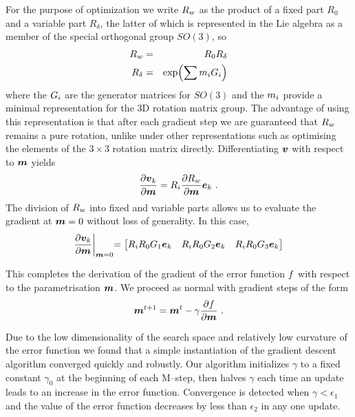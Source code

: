For the purpose of optimization we write $\SceneR$ as the product of a
fixed part $R_0$ and a variable part $R_{\delta}$, the latter of which
is represented in the Lie algebra as a member of the special
orthogonal group $SO(3)$, so
\begin{eqnarray}
  \SceneR &=& R_0 R_{\delta} \\
  R_{\delta} &=& \exp\Bigl(\sum \LieM_i \Gen_i\Bigr)
\end{eqnarray}
where the $\Gen_i$ are the generator matrices for $SO(3)$ and the
$\LieM_i$ provide a minimal representation for the 3D rotation matrix
group. The advantage of using this representation is that after each
gradient step we are guaranteed that $\SceneR$ remains a pure
rotation, unlike under other representations such as optimising the
elements of the $3 \times 3$ rotation matrix directly. Differentiating
$\vpt$ with respect to $\LieMs$ yields
\begin{equation}
  \Deriv{\vpt_k}{\LieMs} = \CamR_i \Deriv{\SceneR}{\LieMs} \ebasis_k ~.
\end{equation}
The division of $\SceneR$ into fixed and variable parts allows us to
evaluate the gradient at $\LieMs=0$ without loss of generality. In
this case,
\begin{equation}
  \Deriv{\vpt_k}{\LieMs} \EvalAt{\LieMs=0} =
  \begin{bmatrix}
    \CamR_i R_0 \Gen_1 \ebasis_k &
    \CamR_i R_0 \Gen_2 \ebasis_k &
    \CamR_i R_0 \Gen_3 \ebasis_k
  \end{bmatrix}
\end{equation}

This completes the derivation of the gradient of the error function
$\ErrorFunc$ with respect to the parametrisation $\LieMs$. We proceed as
normal with gradient steps of the form
\begin{equation}
  \LieMs^{t+1} = \LieMs^t - \gamma \Deriv{\ErrorFunc}{\LieMs} ~.
\end{equation}

Due to the low dimensionality of the search space and relatively low
curvature of the error function we found that a simple instantiation
of the gradient descent algorithm converged quickly and robustly. Our
algorithm initializes $\gamma$ to a fixed constant $\gamma_0$ at the
beginning of each M--step, then halves $\gamma$ each time an update
leads to an increase in the error function. Convergence is detected
when $\gamma<\epsilon_1$ and the value of the error function decreases
by less than $\epsilon_2$ in any one update.

